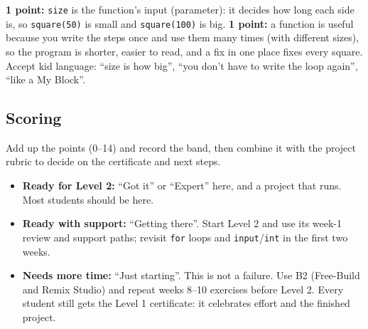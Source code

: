 \begin{answer}
\textbf{1 point:} \texttt{size} is the function's input (parameter): it decides how long each side is, so
\texttt{square(50)} is small and \texttt{square(100)} is big.
\textbf{1 point:} a function is useful because you write the steps once and use them many times (with different sizes),
so the program is shorter, easier to read, and a fix in one place fixes every square.
Accept kid language: \enquote{size is how big}, \enquote{you don't have to write the loop again}, \enquote{like a My Block}.
\end{answer}

\subsection{Scoring}
Add up the points (0--14) and record the band, then combine it with the project rubric to decide on the certificate and next steps.
\begin{itemize}[itemsep=1pt]
  \item \textbf{Ready for Level 2:} \enquote{Got it} or \enquote{Expert} here, and a project that runs. Most students should be here.
  \item \textbf{Ready with support:} \enquote{Getting there}. Start Level 2 and use its week-1 review and support paths; revisit \texttt{for} loops and \texttt{input}/\texttt{int} in the first two weeks.
  \item \textbf{Needs more time:} \enquote{Just starting}. This is not a failure. Use B2 (Free-Build and Remix Studio) and repeat weeks 8--10 exercises before Level 2. Every student still gets the Level 1 certificate: it celebrates effort and the finished project.
\end{itemize}

